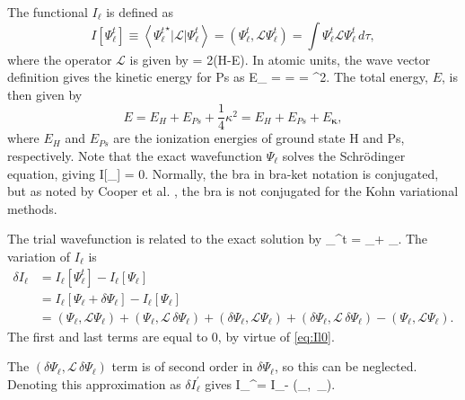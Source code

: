 \documentclass[Dissertation.tex]{subfiles}
\begin{document}
The functional $I_\ell$ is defined as \cite{Adhikari1998}
\begin{equation}
I[\Psi_\ell^t]\equiv \left<{\Psi_\ell^t}^\star | \mathcal{L} | \Psi_\ell^t \right> = \left(\Psi_\ell^t, \mathcal{L} \Psi_\ell^t \right) = \int \Psi_\ell^t \mathcal{L}
  \Psi_\ell^t \,d\tau,
\label{eq:IlDefPsi}
\end{equation}
where the operator $\mathcal{L}$ is given by
\beq
\label{eq:LDef}
 = 2(H-E).
\eeq
In atomic units, the wave vector definition gives the kinetic energy for Ps as
\beq
E_{\bm \kappa} =  =  =  \kappa^2.
\label{eq:Wavenumber}
\eeq
The total energy, $E$, is then given by
\begin{equation}
\label{eq:TotalEnergy}
E = E_H + E_{Ps} + \frac{1}{4}\kappa^2 = E_H + E_{Ps} + E_{\bm \kappa},
\end{equation}
where $E_H$ and $E_{Ps}$ are the ionization energies of ground state H and Ps, respectively.
Note that the exact wavefunction $\Psi_\ell$ solves the Schr\"{o}dinger equation, giving
\beq
\label{eq:Il0}
I[\Psi_\ell] = 0.
\eeq
Normally, the bra in bra-ket notation is conjugated, but as noted by Cooper et al. \cite{Cooper2010}, the bra is not conjugated for the Kohn variational methods.

The trial wavefunction is related to the exact solution by
\beq
\label{eq:PsilTrialRelation}
\Psi_\ell^t = \Psi_\ell + \delta \Psi_\ell.
\eeq
The variation of $I_\ell$ is
\begin{align}
\label{eq:IlPsiVariation1}
\nonumber \delta I_\ell &= I_\ell[\Psi_\ell^t] - I_\ell[\Psi_\ell] \\
\nonumber &= I_\ell[\Psi_\ell + \delta \Psi_\ell] - I_\ell[\Psi_\ell] \\
&= (\Psi_\ell, \mathcal{L} \Psi_\ell) + (\Psi_\ell, \mathcal{L} \,\delta\Psi_\ell) + (\delta\Psi_\ell, \mathcal{L} \Psi_\ell) + (\delta\Psi_\ell, \mathcal{L} \,\delta\Psi_\ell) - (\Psi_\ell, \mathcal{L} \Psi_\ell).
\end{align}
The first and last terms are equal to 0, by virtue of \cref{eq:Il0}. %

The $(\delta\Psi_\ell, \mathcal{L} \,\delta\Psi_\ell)$ term is of second order in $\delta\Psi_\ell$, so this can be neglected. Denoting this approximation as $\delta I_\ell^\prime$ gives
\beq
\label{eq:IlPrimeDef}
\delta I_\ell^\prime = \delta I_\ell - (\delta\Psi_\ell,  \,\delta\Psi_\ell).
\eeq
\end{document}
